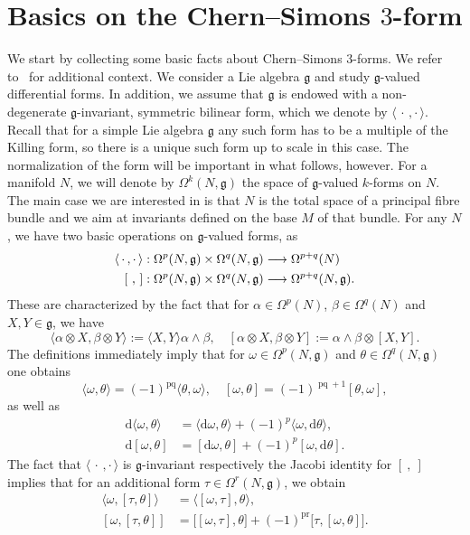 \documentclass[10pt,a4paper]{amsart}
\newcommand{\x}{\times}
\newcommand{\al}{\alpha}
\newcommand{\be}{\beta}
\newcommand{\om}{\omega}
\renewcommand{\th}{\theta}
\newcommand{\Om}{\Omega}
\newcommand{\B}[2]{\langle#1,#2\rangle}
\DeclareMathOperator{\pq}{pq}
\DeclareMathOperator{\pr}{pr}
\renewcommand*{\d}{\mathrm{d}}
\newcommand{\fkg}{\mathfrak{g}}
\renewcommand*{\to}{\mathchoice{\longrightarrow}{\rightarrow}{\rightarrow}{\rightarrow}}
\theoremstyle{definition}\newtheorem{defi}[theo]{Definition}
\begin{document}
\section{Basics on the Chern--Simons \texorpdfstring{$3$}{3}-form}\label{1}

We start by collecting some basic facts about Chern--Simons $3$-forms. We refer to~\cite{MR1337109} for additional context. We consider a Lie algebra $\fkg$ and study $\fkg$-valued differential forms. In addition, we assume that $\fkg$ is endowed with a non-degenerate $\fkg$-invariant, symmetric bilinear form, which we denote by $\B{\,\cdot\,}{\cdot\,}$. Recall that for a simple Lie algebra $\fkg$ any such form has to be a multiple of the Killing form, so there is a unique such form up to scale in this case. The normalization of the form will be important in what follows, however. For a manifold $N$, we will denote by $\Om^k(N,\fkg)$ the space of $\fkg$-valued $k$-forms on $N$. The main case we are interested in is that $N$ is the total space of a principal fibre bundle and we aim at invariants defined on the base $M$ of that bundle. For any $N$, we have two basic operations on $\fkg$-valued forms, as
\begin{align*}
\B{\,\cdot\,}{\cdot\,}:\Om^p(N,\fkg)\x\Om^q(N,\fkg)&\to \Om^{p+q}(N) \\
[\,\,,\,]:\Om^p(N,\fkg)\x\Om^q(N,\fkg)&\to \Om^{p+q}(N,\fkg).
\end{align*}
These are characterized by the fact that for $\al\in\Om^p(N)$, $\be\in\Om^q(N)$ and $X,Y\in\fkg$, we have
\begin{equation}\label{eq:basic-ops}
\B{\al\otimes X}{\be\otimes Y}:=\B{X}{Y} \al\wedge\be, \quad [\al\otimes X,\be\otimes Y]:=\al\wedge\be\otimes[X,Y].
\end{equation}
The definitions immediately imply that for $\om\in\Om^p(N,\fkg)$ and $\theta\in\Om^q(N,\fkg)$ one obtains
\[
\B{\om}{\theta}=(-1)^{\pq}\B{\theta}{\omega}, \quad [\om,\theta]=(-1)^{\pq+1}[\theta,\om],
\]
as well as
\begin{align}
\d\B{\om}{\theta}&=\B{\d\om}{\th}+(-1)^p\B{\om}{\d\th},\label{eq:dB} \\
\d[\om,\th]&=[\d\om,\th]+(-1)^p[\om,\d\th].\label{eq:dL}
\end{align}
The fact that $\B{\,\cdot\,}{\cdot\,}$ is $\fkg$-invariant respectively the Jacobi identity for $[\ ,\ ]$ implies that for an additional form $\tau\in\Om^r(N,\fkg)$, we obtain
\begin{align}
\B{\om}{[\tau,\th]}&=\B{[\om}{\tau],\theta},\label{eq:B-invar}\\
[\om,[\tau,\theta]]&=\bigl[[\om,\tau],\theta]+(-1)^{\pr}[\tau,[\om,\theta]\bigr].\label{eq:Jacobi}
\end{align}
\end{document}
